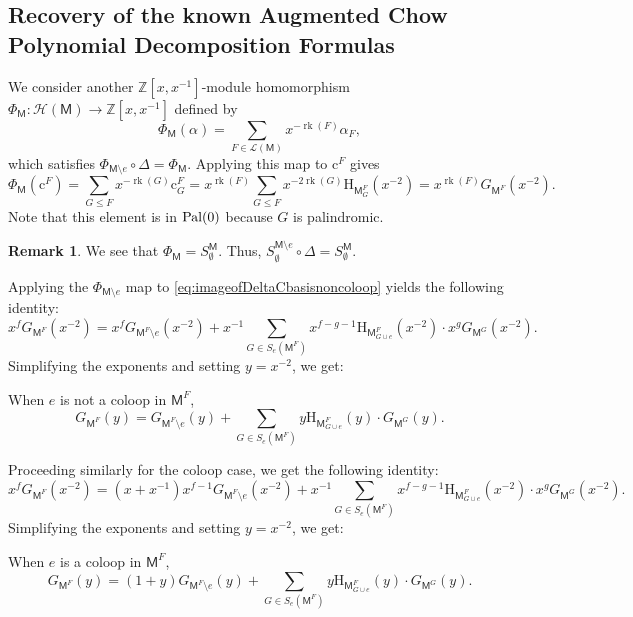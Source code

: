 \documentclass[12pt,letterpaper,english]{amsart}
\theoremstyle{teoremas}
\theoremstyle{definition}
\newtheorem{remark}[theorem]{Remark}
\newcommand{\M}{\mathsf{M}}
\newcommand{\rank}{\operatorname{rk}}
\renewcommand{\H}{\mathrm{H}}
\newcommand{\calH}{\mathcal{H}}
\newcommand{\ZZ}{\mathbb{Z}}
\newcommand{\Cbasis}[1]{\mathrm{c}^{#1}}
\newcommand{\pal}{\normalfont\text{Pal}}
\begin{document}
\subsection{Recovery of the known Augmented Chow Polynomial Decomposition Formulas}
We consider another \(\ZZ[x, x^{-1}]\)-module homomorphism
\(\Phi_{\M} : \calH(\M) \to \ZZ[x, x^{-1}]\) defined by
\[\Phi_{\M}(\alpha) = \sum_{F \in \mathcal{L}(\M)} x^{-\rank(F)} \alpha_F,\]
which satisfies \(\Phi_{\M\setminus e}\circ \Delta = \Phi_{\M}\).
Applying this map to \(\Cbasis{F}\) gives
\[\Phi_{\M}(\Cbasis{F}) = \sum_{G \le F} x^{-\rank(G)} \Cbasis{F}_G =
    x^{\rank(F)}\sum_{G \le F} x^{-2\rank(G)} \H_{\M_G^F}(x^{-2}) =
    x^{\rank(F)} G_{\M^F}(x^{-2}).\]
Note that this element is in \(\pal(0)\) because \(G\) is palindromic.
\begin{remark}
    We see that \(\Phi_{\M} = S^{\M}_{\emptyset}\). Thus,
    \(S^{\M\setminus e}_{\emptyset} \circ \Delta = S^{\M}_{\emptyset}\).
\end{remark}

Applying the \(\Phi_{\M\setminus e}\) map to \eqref{eq:imageofDeltaCbasisnoncoloop} yields the following identity:
\[ x^f G_{\M^F}(x^{-2}) = x^f G_{\M^F\setminus e}(x^{-2}) +
    x^{-1}\sum_{G \in S_e(\M^F)} x^{f-g-1}\H_{\M^F_{G\cup e}}(x^{-2}) \cdot x^g G_{\M^G}(x^{-2}). \]
Simplifying the exponents and setting \(y=x^{-2}\), we get:
\begin{center}
    When \(e\) is not a coloop in \(\M^F\),
    \begin{equation} \label{eq:augchow-decomposition-noncoloop}
        G_{\M^F}(y) = G_{\M^F\setminus e}(y) +
        \sum_{G \in S_e(\M^F)} y \H_{\M^F_{G\cup e}}(y) \cdot G_{\M^G}(y).
    \end{equation}
\end{center}
Proceeding similarly for the coloop case, we get the following identity:
\[ x^f G_{\M^F}(x^{-2}) = (x+x^{-1})x^{f-1}G_{\M^F\setminus e}(x^{-2}) +
    x^{-1}\sum_{G \in S_e(\M^F)} x^{f-g-1}\H_{\M^F_{G\cup e}}(x^{-2}) \cdot x^g G_{\M^G}(x^{-2}). \]
Simplifying the exponents and setting \(y=x^{-2}\), we get:
\begin{center}
    When \(e\) is a coloop in \(\M^F\),
    \begin{equation} \label{eq:augchow-decomposition-coloop}
        G_{\M^F}(y) = (1+y)G_{\M^F\setminus e}(y) +
        \sum_{G \in S_e(\M^F)} y \H_{\M^F_{G\cup e}}(y) \cdot G_{\M^G}(y).
    \end{equation}
\end{center}



\end{document}
